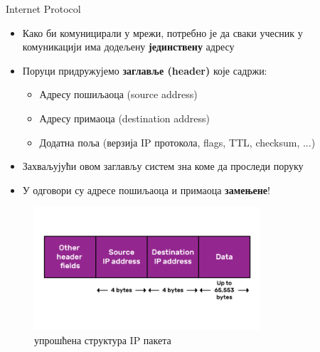 \documentclass{beamer}
\begin{document}
    \begin{frame}[allowframebreaks]{Internet Protocol}
        \begin{itemize}
            \item Како би комуницирали у мрежи, потребно је да сваки учесник у комуникацији има додељену \textbf{јединствену} адресу
            \item Поруци придружујемо \textbf{заглавље (header)} које садржи:
            \begin{itemize}
                \item Адресу пошиљаоца (source address)
                \item Адресу примаоца (destination address)
                \item Додатна поља (верзија IP протокола, flags, TTL, checksum, ...)
            \end{itemize}
            \item Захваљујући овом заглављу систем зна коме да проследи поруку
            \item У одговори су адресе пошиљаоца и примаоца \textbf{замењене}!
        \end{itemize}

        \framebreak

        \begin{figure}
            \centering
            \includegraphics[width=0.75\textwidth]{images/ip.png}
            \caption{упрошћена структура IP пакета}
            \label{fig:ip}
        \end{figure}
    \end{frame}
\end{document}
